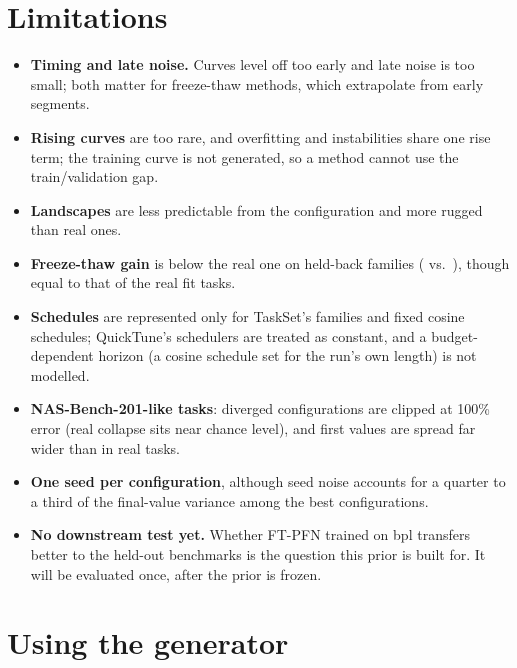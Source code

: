 \documentclass[10pt]{article}
\newcommand{\bpl}{\textsf{bpl}}
\begin{document}
\section{Limitations}

\begin{itemize}
  \item \textbf{Timing and late noise.} Curves level off too early and late noise is too small; both matter for
    freeze-thaw methods, which extrapolate from early segments.
  \item \textbf{Rising curves} are too rare, and overfitting and instabilities share one rise term; the training
    curve is not generated, so a method cannot use the train/validation gap.
  \item \textbf{Landscapes} are less predictable from the configuration and more rugged than real ones.
  \item \textbf{Freeze-thaw gain} is below the real one on held-back families (\bplFT{} vs.\ \realFT{}), though equal to
    that of the real fit tasks.
  \item \textbf{Schedules} are represented only for TaskSet's families and fixed cosine schedules; QuickTune's
    schedulers are treated as constant, and a budget-dependent horizon (a cosine schedule set for the run's own
    length) is not modelled.
  \item \textbf{NAS-Bench-201-like tasks}: diverged configurations are clipped at 100\% error (real collapse sits near
    chance level), and first values are spread far wider than in real tasks.
  \item \textbf{One seed per configuration}, although seed noise accounts for a quarter to a third of the
    final-value variance among the best configurations.
  \item \textbf{No downstream test yet.} Whether FT-PFN trained on \bpl{} transfers better to the held-out benchmarks
    is the question this prior is built for. It will be evaluated once, after the prior is frozen.
\end{itemize}

\section{Using the generator}
\end{document}
